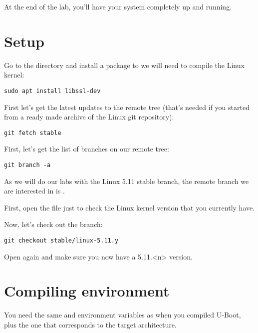 
At the end of the lab, you'll have your system completely up and
running.

\section{Setup}

Go to the  directory and install a
package to we will need to compile the Linux kernel:

\begin{verbatim}
sudo apt install libssl-dev
\end{verbatim}

First let's get the latest updates to the remote  tree
(that's needed if you started from a ready made archive of the Linux git
repository):

\begin{verbatim}
git fetch stable
\end{verbatim}

First, let's get the list of branches on our  remote tree:

\begin{verbatim}
git branch -a
\end{verbatim}

As we will do our labs with the Linux 5.11 stable branch, the remote branch
we are interested in is .

First, open the  file just to check the Linux kernel
version that you currently have.

Now, let's check out the  branch:
\begin{verbatim}
git checkout stable/linux-5.11.y
\end{verbatim}

Open  again and make sure you now have a 5.11.<n> version.

\section{Compiling environment}

You need the same  and  environment
variables as when you compiled U-Boot, plus the  one that
corresponds to the target architecture.

